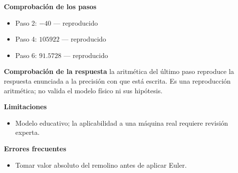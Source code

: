\documentclass[10pt,openany]{book}
\begin{document}
\begin{tcolorbox}[title={Problema resuelto 1}, studiumworked, breakable]
\noindent\textbf{Comprobación de los pasos}
\begin{itemize}
\item Paso 2: $-40$ — reproducido
\item Paso 4: $105922$ — reproducido
\item Paso 6: $91.5728$ — reproducido
\end{itemize}

\noindent\textbf{Comprobación de la respuesta} la aritmética del último paso reproduce la respuesta enunciada a la precisión con que está escrita. Es una reproducción aritmética; no valida el modelo físico ni sus hipótesis.

\noindent\textbf{Limitaciones}
\begin{itemize}
\item Modelo educativo; la aplicabilidad a una máquina real requiere revisión experta.
\end{itemize}

\noindent\textbf{Errores frecuentes}
\begin{itemize}
\item Tomar valor absoluto del remolino antes de aplicar Euler.
\end{itemize}
\end{tcolorbox}
\end{document}
